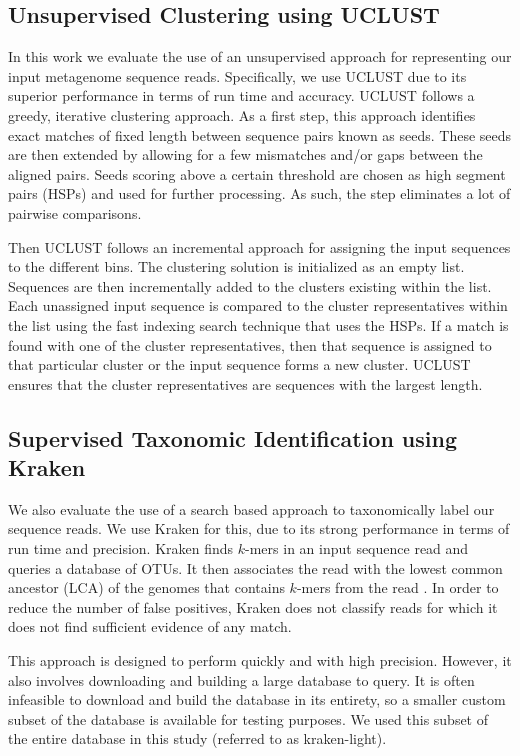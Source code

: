 \subsection{Unsupervised Clustering using UCLUST}
\label{uclustmethods}

In this work we evaluate the use of an unsupervised approach 
for representing our input metagenome sequence reads. Specifically, we 
  use UCLUST \cite{edgar2010search} due to its superior performance in terms 
  of run time and accuracy.
%
%
%
UCLUST \cite{edgar2010search} follows a greedy, iterative clustering approach. As a first 
step, this approach identifies exact matches of fixed length between sequence pairs known 
as seeds. These seeds are then extended by allowing for a few mismatches and/or gaps between 
the aligned pairs. Seeds scoring above a certain threshold are chosen as high segment pairs (HSPs)  and 
used for further processing. As such, the step eliminates a lot of pairwise comparisons. 

Then UCLUST follows an 
incremental approach for assigning the input sequences to the different bins. 
%
%
The clustering solution is initialized as an empty list. Sequences are then 
incrementally added to the clusters existing within the list. 
%
Each unassigned input sequence is compared to the cluster representatives within the list using 
the fast indexing search technique that uses the HSPs. If a match is found with one of the 
cluster representatives, then that sequence is assigned to that particular cluster or the 
input sequence forms a new cluster. 
%
UCLUST ensures
that the cluster representatives are sequences with the largest length. 

\subsection{Supervised Taxonomic Identification using Kraken}

We also evaluate the use of a search based 
approach to taxonomically label our sequence reads. We use 
Kraken for this, due to its strong performance in terms of run time 
and precision. Kraken finds $k$-mers in an input 
sequence read and queries a database of OTUs. It then associates the 
read with the lowest common ancestor (LCA) of the genomes that contains $k$-mers from the read \cite{Kraken}. In order to reduce 
the number of false positives, Kraken does not classify reads for 
which it does not find sufficient evidence of any match.


This approach is designed to perform quickly and with 
high precision. However, it also involves downloading and building 
a large database to query. It is often infeasible to download and 
build the database in its entirety, so a smaller custom  
subset of the database is available for testing 
purposes. We used this 
subset of the entire database in this study (referred to as kraken-light).


